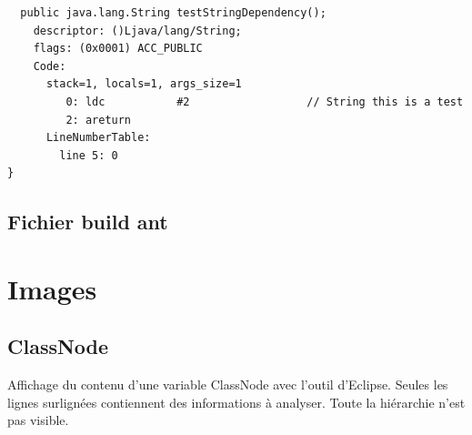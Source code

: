 \documentclass[french,a4paper,12pt]{report}
\begin{document}
\begin{appendices}
\begin{lstlisting}
  public java.lang.String testStringDependency();
    descriptor: ()Ljava/lang/String;
    flags: (0x0001) ACC_PUBLIC
    Code:
      stack=1, locals=1, args_size=1
         0: ldc           #2                  // String this is a test
         2: areturn
      LineNumberTable:
        line 5: 0
}
\end{lstlisting}
 
\section*{Fichier build ant}
\label{antBuild}

    
\chapter*{Images}

\section*{ClassNode}

Affichage du contenu d'une variable ClassNode avec l'outil d'Eclipse. Seules les lignes surlignées contiennent des informations à analyser. Toute la hiérarchie n'est pas visible.

\label{ClassNode}


\end{appendices}
\end{document}
